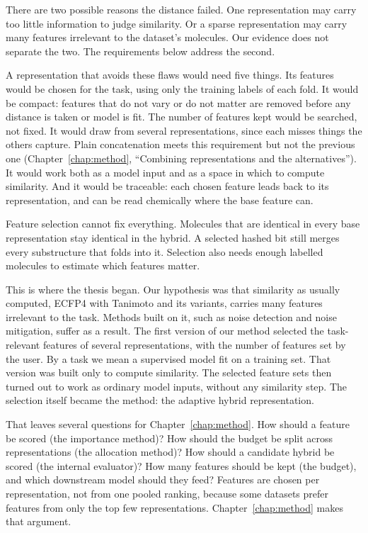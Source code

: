 There are two possible reasons the distance failed. One representation may carry too little information to judge similarity. Or a sparse representation may carry many features irrelevant to the dataset's molecules. Our evidence does not separate the two. The requirements below address the second.

A representation that avoids these flaws would need five things. Its features would be chosen for the task, using only the training labels of each fold. It would be compact: features that do not vary or do not matter are removed before any distance is taken or model is fit. The number of features kept would be searched, not fixed. It would draw from several representations, since each misses things the others capture. Plain concatenation meets this requirement but not the previous one (Chapter~\ref{chap:method}, ``Combining representations and the alternatives''). It would work both as a model input and as a space in which to compute similarity. And it would be traceable: each chosen feature leads back to its representation, and can be read chemically where the base feature can.

Feature selection cannot fix everything. Molecules that are identical in every base representation stay identical in the hybrid. A selected hashed bit still merges every substructure that folds into it. Selection also needs enough labelled molecules to estimate which features matter.

This is where the thesis began. Our hypothesis was that similarity as usually computed, ECFP4 with Tanimoto and its variants, carries many features irrelevant to the task. Methods built on it, such as noise detection and noise mitigation, suffer as a result. The first version of our method selected the task-relevant features of several representations, with the number of features set by the user. By a task we mean a supervised model fit on a training set. That version was built only to compute similarity. The selected feature sets then turned out to work as ordinary model inputs, without any similarity step. The selection itself became the method: the adaptive hybrid representation.

That leaves several questions for Chapter~\ref{chap:method}. How should a feature be scored (the importance method)? How should the budget be split across representations (the allocation method)? How should a candidate hybrid be scored (the internal evaluator)? How many features should be kept (the budget), and which downstream model should they feed? Features are chosen per representation, not from one pooled ranking, because some datasets prefer features from only the top few representations. Chapter~\ref{chap:method} makes that argument.

